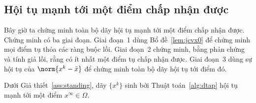 \subsection{Hội tụ mạnh tới một điểm chấp nhận được}\label{ssec:strong}
Bây giờ ta chứng minh toàn bộ dãy hội tụ mạnh tới một điểm chấp nhận được. Chứng minh có ba
giai đoạn. Giai đoạn~1 dùng Bổ đề~\ref{lem:jcvx0} để chứng minh mọi điểm tụ thỏa các
ràng buộc lồi. Giai đoạn~2 chứng minh, bằng phản chứng và tính giả lồi, rằng có ít nhất một
điểm tụ chấp nhận được. Giai đoạn~3 dùng sự hội tụ của $\norm{x^k-\bar x}$ để chứng minh
toàn bộ dãy hội tụ tới điểm đó.

\begin{theorem}\label{thm:strong}
Dưới Giả thiết~\ref{ass:standing}, dãy $\{x^k\}$ sinh bởi
Thuật toán~\ref{alg:dtap} hội tụ mạnh tới một điểm $x^\infty\in\Omega$.
\end{theorem}
